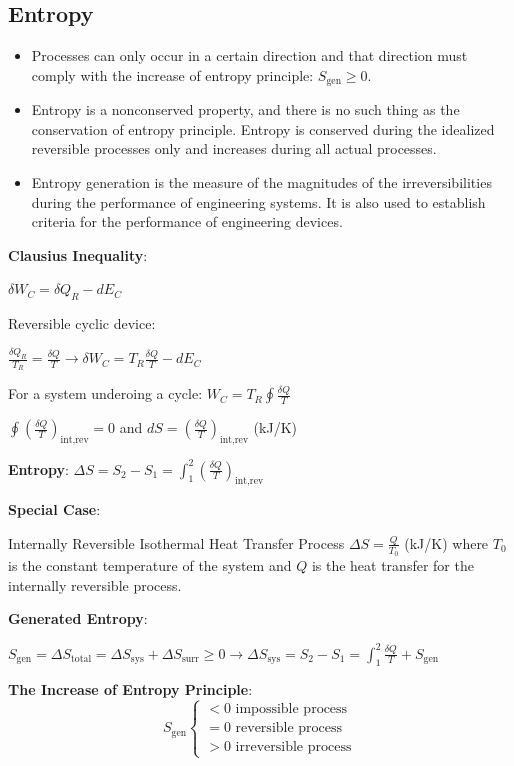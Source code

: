 \documentclass{article}
\begin{document}
\begin{multicols}{3}
    \section*{Entropy}
    \begin{itemize}
        \item Processes can only occur in a certain direction and that direction must comply with the increase of entropy principle: $S_\text{gen}\geq 0$.
        \item Entropy is a nonconserved property, and there is no such thing as the conservation of entropy principle. Entropy is conserved during the idealized reversible processes only and increases during all actual processes.
        \item Entropy generation is the measure of the magnitudes of the irreversibilities during the performance of engineering systems. It is also used to establish criteria for the performance of engineering devices.
    \end{itemize}
    \textbf{Clausius Inequality}: \par 
    $\delta W_C=\delta Q_R-dE_C$\par 
    Reversible cyclic device:\par $\frac{\delta Q_R}{T_R}=\frac{\delta Q}{T}\rightarrow \delta W_C=T_R\frac{\delta Q}{T}-dE_C$\par 
    For a system underoing a cycle: $W_C=T_R\oint\frac{\delta Q}{T}$\par 
    $\oint\left(\frac{\delta Q}{T}\right)_\text{{int,rev}}=0$ and $dS=\left(\frac{\delta Q}{T}\right)_{\text{int,rev}}$ (kJ/K)\par
    \textbf{Entropy}: $\Delta S=S_2-S_1=\int_1^2\left(\frac{\delta Q}{T}\right)_{\text{int,rev}}$\par
    \textbf{Special Case}: \par Internally Reversible Isothermal Heat Transfer Process $\Delta S=\frac{Q}{T_0}$ (kJ/K) where $T_0$ is the constant temperature of the system and $Q$ is the heat transfer for the internally reversible process.\par 
    \textbf{Generated Entropy}: \par
    $S_{\text{gen}}=\Delta S_{\text{total}}=\Delta S_{\text{sys}}+\Delta S_{\text{surr}}\geq 0\rightarrow \Delta S_{\text{sys}}=S_2-S_1=\int_1^2\frac{\delta Q}{T}+S_\text{gen}$\par 
    \textbf{The Increase of Entropy Principle}:
    \begin{equation*}
        S_\text{gen}\left\{
            \begin{array}{l}
                <0\text{ impossible process}\\
                =0\text{ reversible process}\\
                >0\text{ irreversible process}
            \end{array}
        \right.
    \end{equation*}

\end{multicols}
\end{document}

